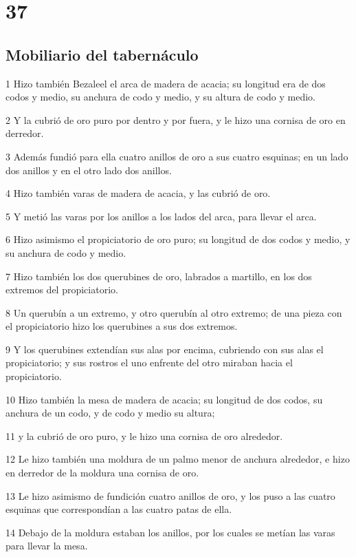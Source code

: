 \chapter{37}

\section*{Mobiliario del tabernáculo}

\par 1 Hizo también Bezaleel el arca de madera de acacia; su longitud era de dos codos y medio, su anchura de codo y medio, y su altura de codo y medio.
\par 2 Y la cubrió de oro puro por dentro y por fuera, y le hizo una cornisa de oro en derredor.
\par 3 Además fundió para ella cuatro anillos de oro a sus cuatro esquinas; en un lado dos anillos y en el otro lado dos anillos.
\par 4 Hizo también varas de madera de acacia, y las cubrió de oro.
\par 5 Y metió las varas por los anillos a los lados del arca, para llevar el arca.
\par 6 Hizo asimismo el propiciatorio de oro puro; su longitud de dos codos y medio, y su anchura de codo y medio.
\par 7 Hizo también los dos querubines de oro, labrados a martillo, en los dos extremos del propiciatorio.
\par 8 Un querubín a un extremo, y otro querubín al otro extremo; de una pieza con el propiciatorio hizo los querubines a sus dos extremos.
\par 9 Y los querubines extendían sus alas por encima, cubriendo con sus alas el propiciatorio; y sus rostros el uno enfrente del otro miraban hacia el propiciatorio.
\par 10 Hizo también la mesa de madera de acacia; su longitud de dos codos, su anchura de un codo, y de codo y medio su altura;
\par 11 y la cubrió de oro puro, y le hizo una cornisa de oro alrededor.
\par 12 Le hizo también una moldura de un palmo menor   de anchura alrededor, e hizo en derredor de la moldura una cornisa de oro.
\par 13 Le hizo asimismo de fundición cuatro anillos de oro, y los puso a las cuatro esquinas que correspondían a las cuatro patas de ella.
\par 14 Debajo de la moldura estaban los anillos, por los cuales se metían las varas para llevar la mesa.
